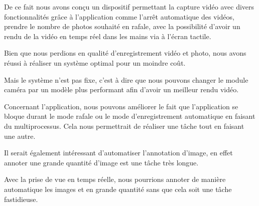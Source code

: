     \begin{flushleft}
        De ce fait nous avons conçu un dispositif permettant la capture vidéo avec divers fonctionnalités grâce à l'application comme l'arrêt automatique des vidéos, prendre le nombre de photos souhaité en rafale, avec la possibilité d'avoir un rendu de la vidéo en temps réel dans les mains via à l'écran tactile.

        \vspace{0.2cm}

        Bien que nous perdions en qualité d'enregistrement vidéo et photo, nous avons réussi à réaliser un système optimal pour un moindre coût.

        \vspace{0.2cm}
    
        Mais le système n'est pas fixe, c'est à dire que nous pouvons changer le module caméra par un modèle plus performant afin d'avoir un meilleur rendu vidéo. 

        \vspace{0.2cm}

        Concernant l'application, nous pouvons améliorer le fait que l'application se bloque durant le mode rafale ou le mode d'enregistrement automatique en faisant du multiprocessus.
        Cela nous permettrait de réaliser une tâche tout en faisant une autre.

        \vspace{0.2cm}

        Il serait également intéressant d'automatiser l'annotation d'image, en effet annoter une grande quantité d'image est une tâche très longue.

        Avec la prise de vue en temps réelle, nous pourrions annoter de manière automatique les images et en grande quantité sans que cela soit une tâche fastidieuse.

    \end{flushleft}


    
